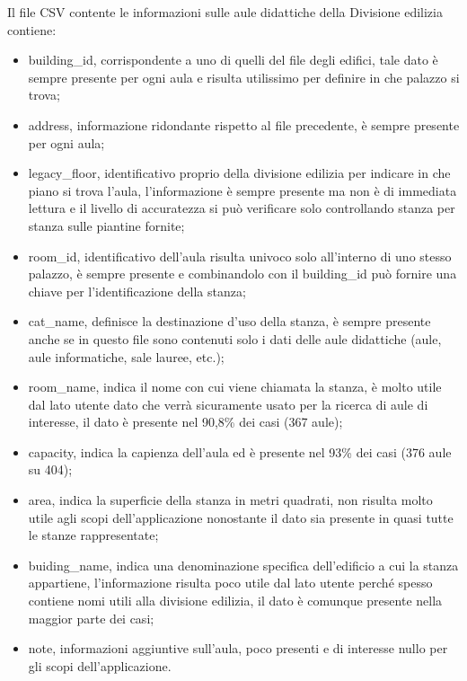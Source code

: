\documentclass[12pt]{report}
\begin{document}
Il file CSV contente le informazioni sulle aule didattiche della Divisione edilizia contiene: %
\begin{itemize}
\item building\_id, corrispondente a uno di quelli del file degli edifici, tale dato è sempre presente per ogni aula e risulta utilissimo per definire in che palazzo si trova;
\item address, informazione ridondante rispetto al file precedente, è sempre presente per ogni aula;
\item legacy\_floor, identificativo proprio della divisione edilizia per indicare in che piano si trova l'aula, l'informazione è sempre presente ma non è di immediata lettura e il livello di accuratezza si può verificare solo controllando stanza per stanza sulle piantine fornite;
\item room\_id, identificativo dell'aula risulta univoco solo all'interno di uno stesso palazzo, è sempre presente e combinandolo con il building\_id può fornire una chiave per l'identificazione della stanza;
\item cat\_name, definisce la destinazione d'uso della stanza, è sempre presente anche se in questo file sono contenuti solo i dati delle aule didattiche (aule, aule informatiche, sale lauree, etc.);
\item room\_name, indica il nome con cui viene chiamata la stanza, è molto utile dal lato utente dato che verrà sicuramente usato per la ricerca di aule di interesse, il dato è presente nel 90,8\% dei casi (367 aule);
\item capacity, indica la capienza dell'aula ed è presente nel 93\% dei casi (376 aule su 404);
\item area, indica la superficie della stanza in metri quadrati, non risulta molto utile agli scopi dell'applicazione nonostante il dato sia presente in quasi tutte le stanze rappresentate;
\item buiding\_name, indica una denominazione specifica dell'edificio a cui la stanza appartiene, l'informazione risulta poco utile dal lato utente perché spesso contiene nomi utili alla divisione edilizia, il dato è comunque presente nella maggior parte dei casi;
\item note, informazioni aggiuntive sull'aula, poco presenti e di interesse nullo per gli scopi dell'applicazione.    
\end{itemize}

\vspace{5mm} %
\end{document}
